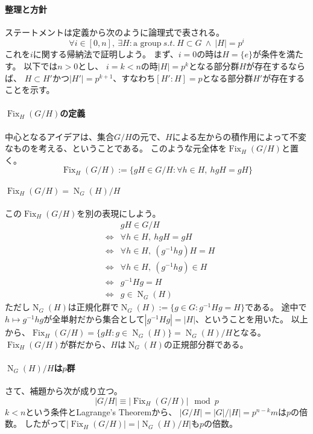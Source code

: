 \documentclass[a4paper]{jsarticle}
\newcommand{\Fix}{\operatorname{Fix}}
\newcommand{\Norm}{\operatorname{N}}
\begin{document}
    \paragraph{整理と方針}
    ステートメントは定義から次のように論理式で表される。
    \[ \forall i \in [0, n],~ \exists H : \mbox{a group} ~s.t.~ H \subset G ~\wedge~ |H|=p^i \]
    これを$i$に関する帰納法で証明しよう。
    まず、$i=0$の時は$H=\{e\}$が条件を満たす。
    以下では$n > 0$とし、
    $i=k<n$の時$|H|=p^k$となる部分群$H$が存在するならば、
    $H \subset H'$かつ$|H'|=p^{k+1}$、すなわち$[H':H]=p$となる部分群$H'$が存在することを示す。

    \paragraph{$\Fix_{H}(G/H)$の定義}
    中心となるアイデアは、集合$G/H$の元で、$H$による左からの積作用によって不変なものを考える、ということである。
    このような元全体を$\Fix_{H}(G/H)$と置く。
    \[
        \Fix_{H}(G/H) := \{ gH \in G/H : \forall h \in H,~ hgH=gH \}
    \]

    \paragraph{$\Fix_{H}(G/H)=\Norm_G(H)/H$}
    この$\Fix_{H}(G/H)$を別の表現にしよう。
    \begin{eqnarray*}
        &{}&    gH \in G/H \\
        &\iff&  \forall h \in H,~ hgH=gH \\
        &\iff&  \forall h \in H,~ (g^{-1}hg)H=H \\
        &\iff&  \forall h \in H,~ (g^{-1}hg) \in H \\
        &\iff&  g^{-1}Hg = H \\
        &\iff&  g \in \Norm_G(H)
    \end{eqnarray*}
    ただし$\Norm_G(H)$は正規化群で$\Norm_G(H) := \{ g \in G : g^{-1}Hg = H\}$である。
    途中で$h \mapsto g^{-1}hg$が全単射だから集合として$|g^{-1}Hg|=|H|$、ということを用いた。
    以上から、$\Fix_{H}(G/H)=\{ gH : g \in \Norm_G(H) \} = \Norm_G(H)/H$となる。
    $\Fix_{H}(G/H)$が群だから、$H$は$\Norm_G(H)$の正規部分群である。

    \paragraph{$\Norm_G(H)/H$は$p$群}
    さて、補題から次が成り立つ。
    \[ |G/H| \equiv |\Fix_{H}(G/H)| \mod p \]
    $k<n$という条件とLagrange's Theoremから、
    $|G/H|=|G|/|H|=p^{n-k}m$は$p$の倍数。
    したがって$|\Fix_{H}(G/H)|=|\Norm_G(H)/H|$も$p$の倍数。
\end{document}
